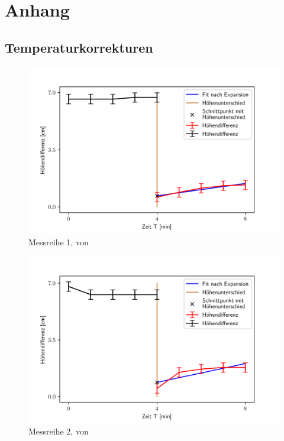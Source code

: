 \documentclass[bibliography=totocnumbered]{scrartcl}
\begin{document}
	\section{Anhang}
	
	\subsection{Temperaturkorrekturen}
	\begin{figure}[!ht]
		\centering									%
		\includegraphics[width=350pt]{fotos/gpr1/Regression_M1.png}			%
		\caption{Messreihe 1, von \theauthor}							%
		\label{Abb: Ben 1}							%
	\end{figure}
\begin{figure}[!ht]
	\centering									%
	\includegraphics[width=350pt]{fotos/gpr1/Regression_M2.png}			%
	\caption{Messreihe 2, von \theauthor}							%
	\label{Abb: Ben 2}							%
\end{figure}
\end{document}
